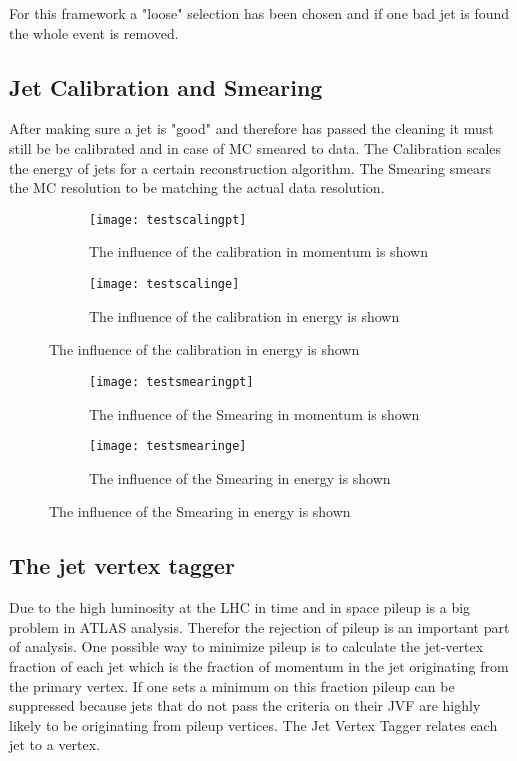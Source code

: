 For this framework a "loose" selection has been chosen and if one bad jet is found the whole event is removed.

\subsection{Jet Calibration and Smearing}

After making sure a jet is "good" and therefore has passed the cleaning it must still be be calibrated and in case of MC smeared to data. The Calibration scales the energy of jets for a certain reconstruction algorithm. The Smearing smears the MC resolution to be matching the actual data resolution.


\begin{figure}
\centering
\begin{subfigure}[b]{0.5\figwidth}
\texttt{[image: testscalingpt]}
\caption[Influence of the JES on the transversal momentum]{The influence of the calibration in momentum is shown}
\label{fig:testscalingpt}
\end{subfigure}
\quad
\begin{subfigure}[b]{0.5\figwidth}
\texttt{[image: testscalinge]}
\caption[Influence of the JES on the energy]{The influence of the calibration in energy is shown}
\label{fig:testscalinge}
\end{subfigure}
\end{figure}


\begin{figure}
\centering
\begin{subfigure}[b]{0.5\figwidth}
\texttt{[image: testsmearingpt]}
\caption[Influence of the Smearing on the transversal momentum]{The influence of the Smearing in momentum is shown}
\label{fig:testsmearingpt}
\end{subfigure}
\quad
\begin{subfigure}[b]{0.5\figwidth}
\texttt{[image: testsmearinge]}
\caption[Influence of the Smearing on the energy]{The influence of the Smearing in energy is shown}
\label{fig:testsmearinge}
\end{subfigure}
\end{figure}


\subsection{The jet vertex tagger}

Due to the high luminosity at the LHC in time and in space pileup is a big problem in ATLAS analysis. Therefor the rejection of pileup is an important part of analysis. One possible way to minimize pileup is to calculate the jet-vertex fraction of each jet which is the fraction of momentum in the jet originating from the primary vertex. If one sets a minimum on this fraction pileup can be suppressed because jets that do not pass the criteria on their JVF are highly likely to be originating from pileup vertices. The Jet Vertex Tagger relates each jet to a vertex.



